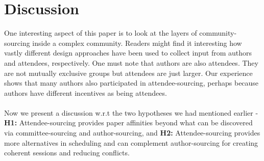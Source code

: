 \documentclass[letterpaper]{article}
\begin{document}
\section{Discussion}
One interesting aspect of this paper is to look at the layers of community-sourcing inside a complex community. Readers might find it interesting how vastly different design approaches have been used to collect input from authors and attendees, respectively. One must note that authors are also attendees. They are not mutually exclusive groups but attendees are just larger. Our experience shows that many authors also participated in attendee-sourcing, perhaps because authors have different incentives as being attendees.
\\
\\
Now we present a discussion w.r.t the two hypotheses we had mentioned earlier - \textbf{H1:} Attendee-sourcing provides paper affinities beyond what can be discovered via committee-sourcing and author-sourcing, and \textbf{H2:} Attendee-sourcing provides more alternatives in scheduling and can complement author-sourcing for creating coherent sessions and reducing conflicts.
\end{document}
